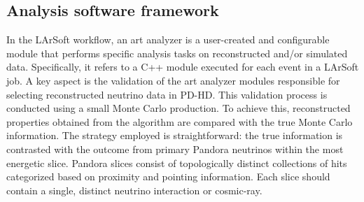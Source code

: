 \subsection{Analysis software framework} \label{chap:anaValidation}
In the LArSoft workflow, an art analyzer is a user-created and configurable module that performs specific analysis tasks on reconstructed and/or simulated data. Specifically, it refers to a C++ module executed for each event in a LArSoft job. A key aspect is the validation of the art analyzer modules responsible for selecting reconstructed neutrino data in PD-HD. This validation process is conducted using a small Monte Carlo production. To achieve this, reconstructed properties obtained from the algorithm are compared with the true Monte Carlo information. The strategy employed is straightforward: the true information is contrasted with the outcome from primary Pandora neutrinos within the most energetic slice. Pandora slices consist of topologically distinct collections of hits categorized based on proximity and pointing information. Each slice should contain a single, distinct neutrino interaction or cosmic-ray.

